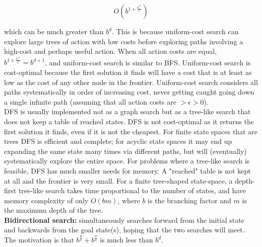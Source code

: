         \[
            O\left(b^{1+\frac{C^*}{\epsilon}}\right)
        \]

        which can be much greater than $b^d$. This is because uniform-cost search can explore large trees of action with low costs before exploring paths involving a high-cost and perhaps useful action. When all action
        costs are equal, $b^{1+\frac{C^*}{\epsilon}} = b^{d+1}$, and uniform-cost search is similar to BFS. Uniform-cost search is cost-optimal because the first solution it finds will have a cost that is at least as low
        as the cost of any other node in the frontier. Uniform-cost search considers all paths systematically in order of increasing cost, never getting caught going down a single infinite path
        (assuming that all action costs are $>\epsilon > 0$). \\

        DFS is usually implemented not as a graph search but as a tree-like search that does not keep a table of reached states. DFS is not cost-optimal as it returns the first solution it finds, even if it is not the
        cheapest. For finite state spaces that are trees DFS is efficient and complete; for acyclic state spaces it may end up expanding the same state many times via different paths, but will (eventually)
        systematically explore the entire space. For problems where a tree-like search is feasible, DFS has much smaller needs for memory. A "reached" table is not kept at all and the frontier is very small. For a finite
        tree-shaped state-space, a depth-first tree-like search takes time proportional to the number of states, and have memory complexity of only $O(bm)$, where $b$ is the branching factor and $m$ is the maximum
        depth of the tree. \\

        \textbf{Bidirectional search:} simultaneously searches forward from the initial state and backwards from the goal state(s), hoping that the two searches will meet. The motivation is that
        $b^\frac{d}{2}+b^\frac{d}{2}$ is much less than $b^d$.

